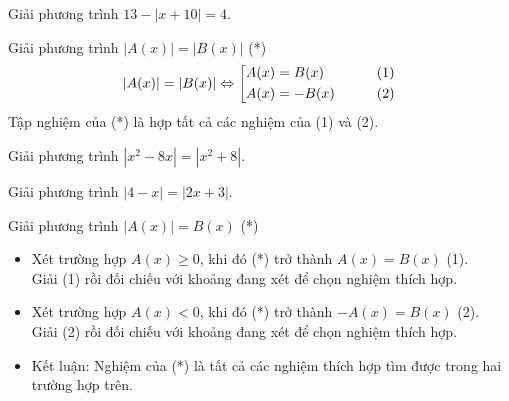 \begin{vd}%
Giải phương trình $13 - |x+10| = 4$.
\end{vd}

\begin{dang}{Giải phương trình $|A(x)| = |B(x)|$ \quad(*)}
	\[|A(x)| = |B(x)| \Leftrightarrow \left[\begin{aligned}& A(x) = B(x) & \qquad(1) \\ & A(x) = - B(x) & \qquad(2)\end{aligned}\right. \]
	Tập nghiệm của (*) là hợp tất cả các nghiệm của (1) và (2).
\end{dang}

\begin{vd}%
	Giải phương trình $\left| x^2 - 8x \right| = \left| x^2 + 8 \right|$.
\end{vd}

\begin{vd}%
	Giải phương trình $|4-x| = |2x+3|$.
\end{vd}

\begin{dang}{Giải phương trình $|A(x)| = B(x)$ \quad(*)}
	\begin{itemize}
		\item Xét trường hợp $A(x) \ge 0$, khi đó (*) trở thành $A(x) = B(x)$ \hfill(1). \\
		Giải (1) rồi đối chiếu với khoảng đang xét để chọn nghiệm thích hợp.
		\item Xét trường hợp $A(x) < 0$, khi đó (*) trở thành $-A(x) = B(x)$ \hfill(2). \\
		Giải (2) rồi đối chiếu với khoảng đang xét để chọn nghiệm thích hợp.
		\item Kết luận: Nghiệm của (*) là tất cả các nghiệm thích hợp tìm được trong hai trường hợp trên.
	\end{itemize}
\end{dang}

